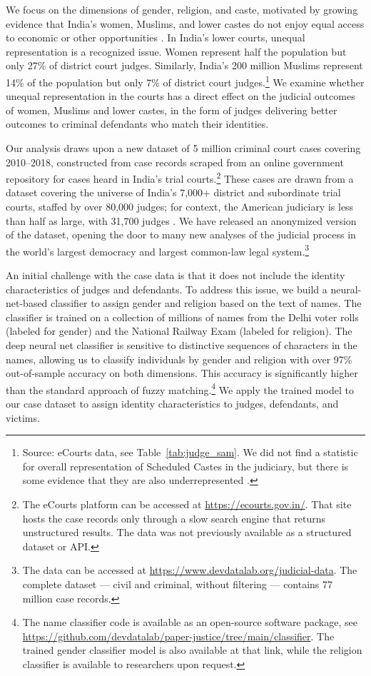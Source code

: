 \documentclass[12pt,english]{article}
\begin{document}
We focus on the dimensions of gender, religion, and caste, motivated by growing evidence that India's women, Muslims, and lower castes do not enjoy equal access to economic or other opportunities \citep{ito2009caste,BertrandHannaMullainathan2010JoPE,HannaLinden2012AEJEP,jayachandran2015roots,borker2017safety,anr2020mob}. In India's lower courts, unequal representation is a recognized issue. Women represent half the population but only 27\% of district court judges. Similarly, India's 200 million Muslims represent 14\% of the population but only 7\% of district court judges.\footnote{Source: eCourts data, see Table~\ref{tab:judge_sam}. We did not find a statistic for overall representation of Scheduled Castes in the judiciary, but there is some evidence that they are also underrepresented \citep{times2018obcs}.} We examine whether unequal representation in the courts has a direct effect on the judicial outcomes of women, Muslims and lower castes, in the form of judges delivering better outcomes to criminal defendants who match their identities. 

Our analysis draws upon a new dataset of 5 million criminal court cases covering 2010--2018, constructed from case records scraped from an online government repository for cases heard in India's trial courts.\footnote{The eCourts platform can be accessed at \url{https://ecourts.gov.in/}. That site hosts the case records only through a slow search engine that returns unstructured results. The data was not previously available as a structured dataset or API. } These cases are drawn from a dataset covering the universe of India's 7,000+ district and subordinate trial courts, staffed by over 80,000 judges; for context, the American judiciary is less than half as large, with 31,700 judges \citep{faqs2021}. We have released an anonymized version of the dataset, opening the door to many new analyses of the judicial process in the world's largest democracy and largest common-law legal system.\footnote{The data can be accessed at \url{https://www.devdatalab.org/judicial-data}. The complete dataset --- civil and criminal, without filtering --- contains 77 million case records.}

An initial challenge with the case data is that it does not include the identity characteristics of judges and defendants. To address this issue, we build a neural-net-based classifier to assign gender and religion based on the text of names. The classifier is trained on a collection of millions of names from the Delhi voter rolls (labeled for gender) and the National Railway Exam (labeled for religion). The deep neural net classifier is sensitive to distinctive sequences of characters in the names, allowing us to classify individuals by gender and religion with over 97\% out-of-sample accuracy on both dimensions. This accuracy is significantly higher than the standard approach of fuzzy matching.\footnote{The name classifier code is available as an open-source software package, see \url{https://github.com/devdatalab/paper-justice/tree/main/classifier}. The trained gender classifier model is also available at that link, while the religion classifier is available to researchers upon request.}  We apply the trained model to our case dataset to assign identity characteristics to judges, defendants, and victims.
\end{document}
